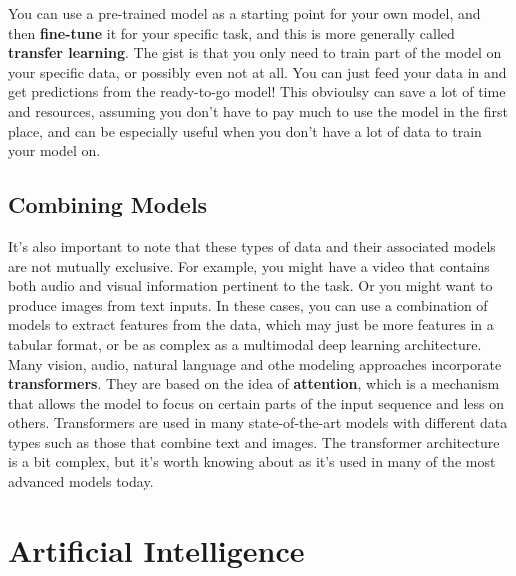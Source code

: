 \documentclass[
  letterpaper,
]{krantz}
\begin{document}
You can use a pre-trained model as a starting point for your own model,
and then \textbf{fine-tune} it for your specific task, and this is more
generally called \textbf{transfer learning}. The gist is that you only
need to train part of the model on your specific data, or possibly even
not at all. You can just feed your data in and get predictions from the
ready-to-go model! This obvioulsy can save a lot of time and resources,
assuming you don't have to pay much to use the model in the first place,
and can be especially useful when you don't have a lot of data to train
your model on.

\subsection{Combining Models}\label{combining-models}

It's also important to note that these types of data and their
associated models are not mutually exclusive. For example, you might
have a video that contains both audio and visual information pertinent
to the task. Or you might want to produce images from text inputs. In
these cases, you can use a combination of models to extract features
from the data, which may just be more features in a tabular format, or
be as complex as a multimodal deep learning architecture. Many vision,
audio, natural language and othe modeling approaches incorporate
\textbf{transformers}. They are based on the idea of \textbf{attention},
which is a mechanism that allows the model to focus on certain parts of
the input sequence and less on others. Transformers are used in many
state-of-the-art models with different data types such as those that
combine text and images. The transformer architecture is a bit complex,
but it's worth knowing about as it's used in many of the most advanced
models today.

\section{Artificial Intelligence}\label{artificial-intelligence}
\end{document}
